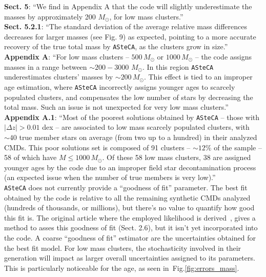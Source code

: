 \documentclass{article}
\begin{document}
\noindent * \textbf{Sect. 5}: ``We find in Appendix A that the code will
slightly underestimate the masses by approximately 200 $M_{\odot}$, for low mass
clusters.''\\
\noindent * \textbf{Sect. 5.2.1}: ``The standard deviation of the average
relative mass differences decreases for larger masses (see Fig. 9) as expected,
pointing to a more accurate recovery of the true total mass by \texttt{ASteCA},
as the clusters grow in size.''\\
\noindent * \textbf{Appendix A}\@: ``For low mass clusters -- $500\,M_{\odot}$
or $1000\,M_{\odot}$ -- the code assigns masses in a range between ${\sim}200
{-}3000$ $M_{\odot}$. In this region \texttt{ASteCA} underestimates clusters'
masses by ${\sim}200\,M_{\odot}$. This effect is tied to an improper age
estimation, where \texttt{ASteCA} incorrectly assigns younger ages to scarcely
populated clusters, and compensates the low number of stars by decreasing the
total mass. Such an issue is not unexpected for very low mass clusters.''\\
\noindent * \textbf{Appendix A.1}: ``Most of the poorest solutions obtained by
\texttt{ASteCA} -- those with $|\Delta z|{>}0.01$ dex -- are associated to low
mass scarcely populated clusters, with ${\sim}40$ true member stars on average 
(from two up to a hundred) in their analyzed CMDs. This poor solutions set is
composed of 91 clusters -- ${\sim}12\%$ of the sample -- 58 of which have
$M{\le}1000\,M_{\odot}$.
Of these 58 low mass clusters, 38 are assigned younger ages by the code due to
an improper field star decontamination process (an expected issue when the
number of true members is very low).''\\

\texttt{ASteCA} does not currently provide a ``goodness of fit''
parameter. The best fit obtained by the code is relative to all the
remaining synthetic CMDs analyzed (hundreds of thousands, or millions), but
there's no value to quantify how good this fit is. The original
article where the employed likelihood is derived~\citep{Dolphin_2002}, gives a
method to asses this goodness of fit (Sect. 2.6), but it isn't yet incorporated
into the code.
%
A coarse ``goodness of fit'' estimator are the uncertainties obtained for the
best fit model. For low mass clusters, the stochasticity involved in their
generation will impact as larger overall uncertainties assigned to its
parameters. This is particularly noticeable for the age, as seen
in~Fig.\ref{fig:errors_mass}.\\
\end{document}
